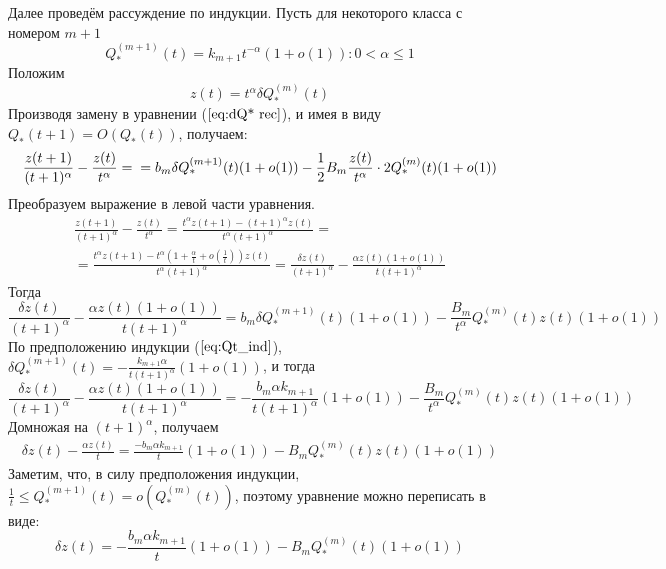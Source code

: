 \documentclass[12pt]{article}
\begin{document}
Далее проведём рассуждение по индукции. Пусть для некоторого класса с номером $m+1$
\begin{equation}
\label{eq:Qt_ind}
	Q^{(m+1)}_*(t) = k_{m+1} t^{-\alpha} (1+o(1)) \colon 0 < \alpha \le 1
\end{equation}
Положим
\begin{equation}
	z(t) = t^{\alpha} \delta Q^{(m)}_*(t)
\end{equation}
Производя замену в уравнении ($\ref{eq:dQ* rec}$), и имея в виду $Q_*(t+1) = O\left(Q_*(t)\right)$, получаем:
\begin{equation*}
	\frac{z(t+1)}{(t+1)^\alpha} - \frac{z(t)}{t^\alpha} = \\
	= b_m \delta Q^{(m+1)}_*(t)(1+o(1)) - \frac{1}{2} B_m \frac{z(t)}{t^\alpha} \cdot 2Q^{(m)}_*(t)(1+o(1))
\end{equation*}
Преобразуем выражение в левой части уравнения.
\begin{multline*}
	\frac{z(t+1)}{(t+1)^\alpha} - \frac{z(t)}{t^\alpha} = \frac{t^\alpha z(t+1) - (t+1)^\alpha z(t)}{t^\alpha (t+1)^\alpha} = \\
	= \frac{t^\alpha z(t+1) - t^\alpha \left( 1 + \frac{\alpha}{t} + o\left( \frac{1}{t} \right) \right) z(t)}{t^\alpha (t+1)^\alpha} =	\frac{\delta z(t)}{(t+1)^\alpha} - \frac{\alpha z(t) (1+o(1))}{t(t+1)^\alpha}
\end{multline*}
Тогда
\begin{equation*}
	\frac{\delta z(t)}{(t+1)^\alpha} - \frac{\alpha z(t) (1+o(1))}{t(t+1)^\alpha} = b_m \delta Q^{(m+1)}_*(t)(1+o(1))	- \frac{B_m}{t^\alpha} Q^{(m)}_*(t)z(t)(1+o(1))
\end{equation*}
По предположению индукции ($\ref{eq:Qt_ind}$), $\delta Q^{(m+1)}_*(t) = - \frac{k_{m+1} \alpha}{t(t+1)^\alpha} (1+o(1))$, и тогда
\begin{equation*}
	\frac{\delta z(t)}{(t+1)^\alpha} - \frac{\alpha z(t) (1+o(1))}{t(t+1)^\alpha} = - \frac{b_m \alpha k_{m+1}}{t(t+1)^\alpha}(1+o(1)) - \frac{B_m}{t^\alpha} Q^{(m)}_*(t)z(t)(1+o(1))
\end{equation*}
Домножая на $(t+1)^\alpha$, получаем
\begin{eqnarray*}
	\delta z(t) - \frac{\alpha z(t)}{t} = \frac{-b_m \alpha k_{m+1}}{t}(1+o(1)) - B_m Q^{(m)}_*(t)z(t)(1+o(1))
\end{eqnarray*}
Заметим, что, в силу предположения индукции, $\frac{1}{t} \le Q^{(m+1)}_*(t) = o(Q^{(m)}_*(t))$, поэтому уравнение можно переписать в виде:
\begin{equation}
\label{eq:dz final}
	\delta z(t) = - \frac{b_m \alpha k_{m+1}}{t}(1+o(1)) - B_m Q^{(m)}_*(t)(1+o(1))
\end{equation}
\end{document}
